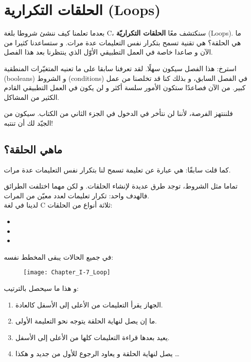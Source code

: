 \chapter{الحلقات التكرارية (\textenglish{Loops})}

بعدما تعلمنا كيف ننشئ شروطا بلغة 
\textenglish{C}،
سنكتشف معًا 
\textbf{الحلقات التكراريّة} (\textenglish{Loops}).
ما هي الحلقة؟ هي تقنية تسمح بتكرار نفس التعليمات عدة مرات. و ستساعدنا كثيرا من الآن و صاعدا خاصة في العمل التطبيقي الأوّل الذي ينتظرنا بعد هذا الفصل.

استرخ: هذا الفصل سيكون سهلًا. لقد تعرفنا سابقا على ما تعنيه المتغيّرات المنطقية
(\textenglish{booleans})
و الشروط 
(\textenglish{conditions})
في الفصل السابق، و بذلك كنا قد تخلصنا من عمل كبير. من الآن فصاعدًا ستكون الأمور سلسة أكثر و لن يكون في العمل التطبيقي القادم الكثير من المشاكل.

فلننتهز الفرصة، لأننا لن نتأخر في الدخول في الجزء الثاني من الكتاب. سيكون من الجيّد لك أن تنتبه!

\section{ماهي الحلقة؟}

كما قلت سابقًا: هي عبارة عن تعليمة تسمح لنا بتكرار نفس التعليمات عدة مرات. 

تماما مثل الشروط، توجد طرق عديدة لإنشاء الحلقات. و لكن مهما اختلفت الطرائق فالهدف واحد: تكرار تعليمات لعدد معيّن من المرات. \\
لدينا في لغة 
\textenglish{C}
ثلاثة أنواع من الحلقات:
\begin{itemize}
	\item {}
	\item {}
	\item {}
\end{itemize}
في جميع الحالات يبقى المخطط نفسه:

\begin{figure}[H]
	\centering
	\texttt{[image: Chapter\_I-7\_Loop]}
\end{figure}
و هذا ما سيحصل بالترتيب:

\begin{enumerate}
	\item الجهاز يقرأ التعليمات من الأعلى إلى الأسفل كالعادة.
	\item ما إن يصل لنهاية الحلقة يتوجه نحو التعليمة الأولى.
	\item يعيد بعدها قراءة التعليمات كلها من الأعلى إلى الأسفل.
	\item يصل لنهاية الحلقة و يعاود الرجوع للأول من جديد و هكذا \dots
\end{enumerate}


